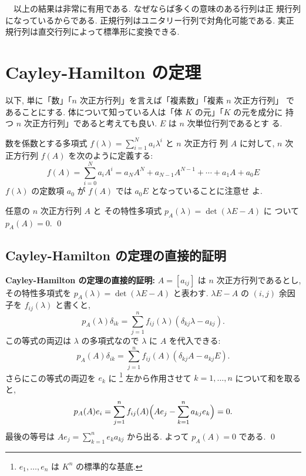 \documentclass[12pt,twoside]{jarticle}
\begin{document}
\bigskip

\noindent
{\Large 　以上の結果は非常に有用である.  なぜならば多くの意味のある行列は正
  規行列になっているからである.  正規行列はユニタリー行列で対角化可能である.
  実正規行列は直交行列によって標準形に変換できる.}


\section{Cayley-Hamilton の定理}
\label{sec:Cayley-Hamilton}

以下, 単に「数」「$n$ 次正方行列」を言えば「複素数」「複素 $n$ 次正方行列」
であることにする.  体について知っている人は「体 $K$ の元」「$K$ の元を成分に
持つ $n$ 次正方行列」であると考えても良い.  $E$ は $n$ 次単位行列であるとす
る. 

数を係数とする多項式 $f(\lambda)=\sum_{i=1}^N a_i\lambda^i$ と $n$ 次正方行
列 $A$ に対して, $n$ 次正方行列 $f(A)$ を次のように定義する:
\begin{equation*}
  f(A) = \sum_{i=0}^N a_i A^i 
  = a_N A^N + a_{N-1}A^{N-1} + \cdots + a_1 A + a_0 E
\end{equation*}
$f(\lambda)$ の定数項 $a_0$ が $f(A)$ では $a_0 E$ となっていることに注意せ
よ.

\begin{theorem}
  任意の $n$ 次正方行列 $A$ と
  その特性多項式 $p_A(\lambda)=\det(\lambda E - A)$ に
  ついて $p_A(A)=0$.  \qed
\end{theorem}


\subsection{Cayley-Hamilton の定理の直接的証明}
\label{sec:CH-direct}

{\bf Cayley-Hamilton の定理の直接的証明:} 
$A=[a_{ij}]$ は $n$ 次正方行列であるとし, 
その特性多項式を $p_A(\lambda)=\det(\lambda E - A)$ と表わす.
$\lambda E - A$ の $(i,j)$ 余因子を $f_{ij}(\lambda)$ と書くと,
\begin{equation*}
  p_A(\lambda)\delta_{ik}
  = \sum_{j=1}^n f_{ij}(\lambda) (\delta_{kj}\lambda - a_{kj}).
\end{equation*}
この等式の両辺は $\lambda$ の多項式なので $\lambda$ に $A$ を代入できる:
\begin{equation*}
  p_A(A)\delta_{ik} = \sum_{j=1}^n f_{ij}(A)(\delta_{kj}A - a_{kj}E).
\end{equation*}
さらにこの等式の両辺を $e_k$ に%
\footnote{$e_1,\dots,e_n$ は $K^n$ の標準的な基底.}%
左から作用させて $k=1,\dots,n$ について和を取ると, 
\begin{equation*}
  p_A(A)e_i
  = \sum_{j=1}^n f_{ij}(A)\Bigl( A e_j - \sum_{k=1}^n a_{kj} e_k \Bigr)
  = 0.
\end{equation*}
最後の等号は $Ae_j=\sum_{k=1}^n e_k a_{kj}$ から出る. 
よって $p_A(A)=0$ である.
\qed
\end{document}
